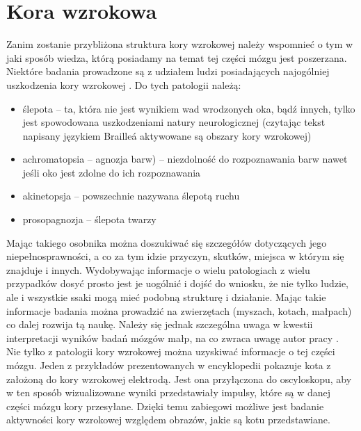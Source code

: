 \section{Kora wzrokowa}
\label{badaniaKoryWzrokowej}
Zanim zostanie przybliżona struktura kory wzrokowej należy wspomnieć o tym w jaki sposób wiedza, którą posiadamy na temat tej części mózgu jest poszerzana. Niektóre badania prowadzone są z udziałem ludzi posiadających najogólniej uszkodzenia kory wzrokowej \cite{Girkin2001}. Do tych patologii należą:
\begin{itemize} 
\item ślepota -- ta, która nie jest wynikiem wad wrodzonych oka, bądź innych, tylko jest spowodowana uszkodzeniami natury neurologicznej (czytając tekst napisany językiem Braille\'a aktywowane są obszary kory wzrokowej)
\item achromatopsia -- agnozja barw) -- niezdolność do rozpoznawania barw nawet jeśli oko jest zdolne do ich rozpoznawania
\item akinetopsja -- powszechnie nazywana ślepotą ruchu %
\item prosopagnozja -- ślepota twarzy \cite{Gauthier1999}
\end{itemize}

Mając takiego osobnika można doszukiwać się szczegółów dotyczących jego niepełnosprawności, a co za tym idzie przyczyn, skutków, miejsca w którym się znajduje i innych. Wydobywając informacje o wielu patologiach z wielu przypadków dosyć prosto jest je uogólnić i dojść do wniosku, że nie tylko ludzie, ale i wszystkie ssaki mogą mieć podobną strukturę i działanie. Mając takie informacje badania można prowadzić na zwierzętach (myszach, kotach, małpach) co dalej rozwija tą naukę. Należy się jednak szczególna uwaga w kwestii interpretacji wyników badań mózgów małp, na co zwraca uwagę autor pracy \cite{Kaas1995}.\\

Nie tylko z patologii kory wzrokowej można uzyskiwać informacje o tej części mózgu. Jeden z przykładów prezentowanych w encyklopedii \cite{encyclopedia} pokazuje kota z założoną do kory wzrokowej elektrodą. Jest ona przyłączona do oscyloskopu, aby w ten sposób wizualizowane wyniki przedstawiały impulsy, które są w danej części mózgu kory przesyłane. Dzięki temu zabiegowi możliwe jest badanie aktywności kory wzrokowej względem obrazów, jakie są kotu przedstawiane.\\

